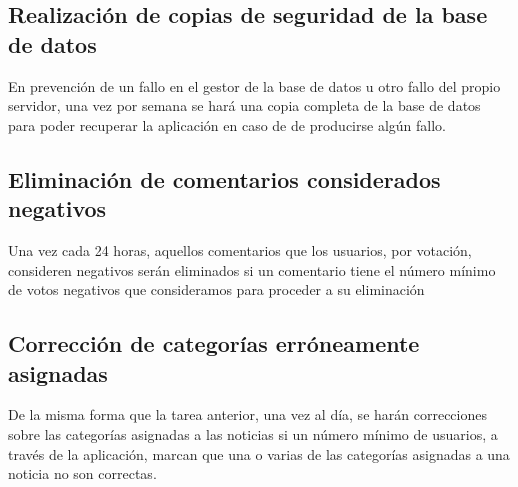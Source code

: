 \subsection{Realización de copias de seguridad de la base de datos}

En prevención de un fallo en el gestor de la base de datos u otro fallo del propio servidor, una vez por semana se hará una copia completa de la base de datos para poder recuperar la aplicación en caso de de producirse algún fallo.

\subsection{Eliminación de comentarios considerados negativos}

Una vez cada 24 horas, aquellos comentarios que los usuarios, por votación, consideren negativos serán eliminados si un comentario tiene el número mínimo de votos negativos que consideramos para proceder a su eliminación

\subsection{Corrección de categorías erróneamente asignadas}

De la misma forma que la tarea anterior, una vez al día, se harán correcciones sobre las categorías asignadas a las noticias si un número mínimo de usuarios, a través de la aplicación, marcan que una o varias de las categorías asignadas a una noticia no son correctas.